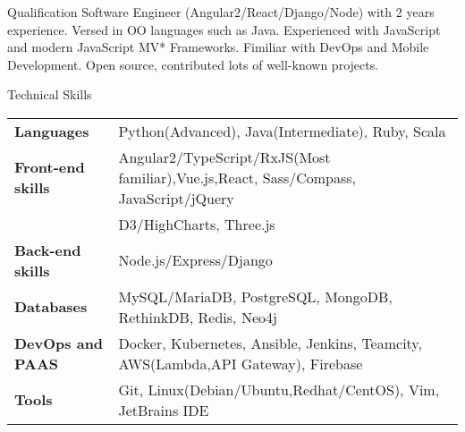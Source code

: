\documentclass{resume} %
\date{\specialdate\today}
\begin{document}


\begin{rSection}{Qualification}
Software Engineer (Angular2/React/Django/Node) with 2 years experience. Versed in OO languages such as Java. Experienced with JavaScript and modern JavaScript MV* Frameworks. Fimiliar with DevOps and Mobile Development. Open source, contributed lots of well-known projects.

\end{rSection}








\begin{rSection}{Technical Skills}

\begin{tabular}{ @{} >{\bfseries}l @{\hspace{6ex}} l }
Languages& Python(Advanced), Java(Intermediate), Ruby, Scala\\
Front-end skills & Angular2/TypeScript/RxJS(Most familiar),Vue.js,React, Sass/Compass, JavaScript/jQuery \\&
  D3/HighCharts, Three.js \\
Back-end skills & Node.js/Express/Django \\
Databases & MySQL/MariaDB, PostgreSQL, MongoDB, RethinkDB, Redis, Neo4j \\
DevOps and PAAS & Docker, Kubernetes, Ansible, Jenkins, Teamcity, AWS(Lambda,API Gateway), Firebase \\
Tools & Git, Linux(Debian/Ubuntu,Redhat/CentOS), Vim, JetBrains IDE

\end{tabular}

\end{rSection}
\end{document}
